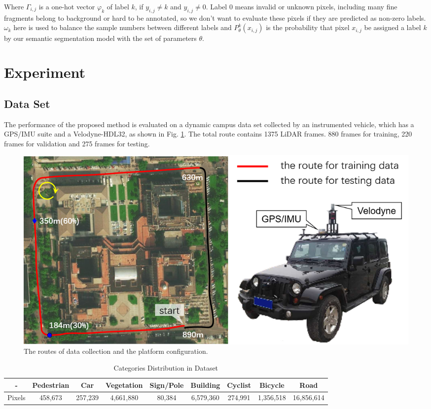 Where $\varGamma_{i,j}$ is a one-hot vector $\varphi_k$ of label $k$, if $y_{i,j}\neq k$ and $y_{i,j}\neq0$. Label 0 means invalid or unknown pixels, including many fine fragments belong to background or hard to be annotated, so we don't want to evaluate these pixels if they are predicted as non-zero labels. $\omega_{k}$ here is used to balance the sample numbers between different labels and $P^k_{\theta}(x_{i,j})$ is the probability that pixel $x_{i,j}$ be assigned a label $k$ by our semantic segmentation model with the set of parameters $\theta$.

\section{Experiment}
\subsection{Data Set}
The performance of the proposed method is evaluated on a dynamic campus data set collected by an instrumented vehicle, which has a GPS/IMU suite and a Velodyne-HDL32, as shown in Fig. \ref{fig:collect_route}. The total route contains 1375 LiDAR frames. 880 frames for training, 220 frames for validation and 275 frames for testing.

\begin{figure}[ht]
\centering
\includegraphics[width=1.0\linewidth]{fig/collect_route}
\caption{The routes of data collection and the platform configuration.}
\label{fig:collect_route}
\end{figure}

\begin{table}
		\caption{Categories Distribution in Dataset}
		\label{category_distribution}
		\centering
		\small
		\renewcommand{\arraystretch}{1.5}
		\begin{tabular}{|c|c|c|c|c|c|c|c|c|}
			\hline
			 - & Pedestrian & Car & Vegetation & Sign/Pole & Building & Cyclist & Bicycle & Road	\\
			\hline
			Pixels & 458,673 & 257,239 & 4,661,880 & 80,384 & 6,579,360 & 274,991 & 1,356,518 & 16,856,614	\\
			\hline
		\end{tabular}
\end{table}


